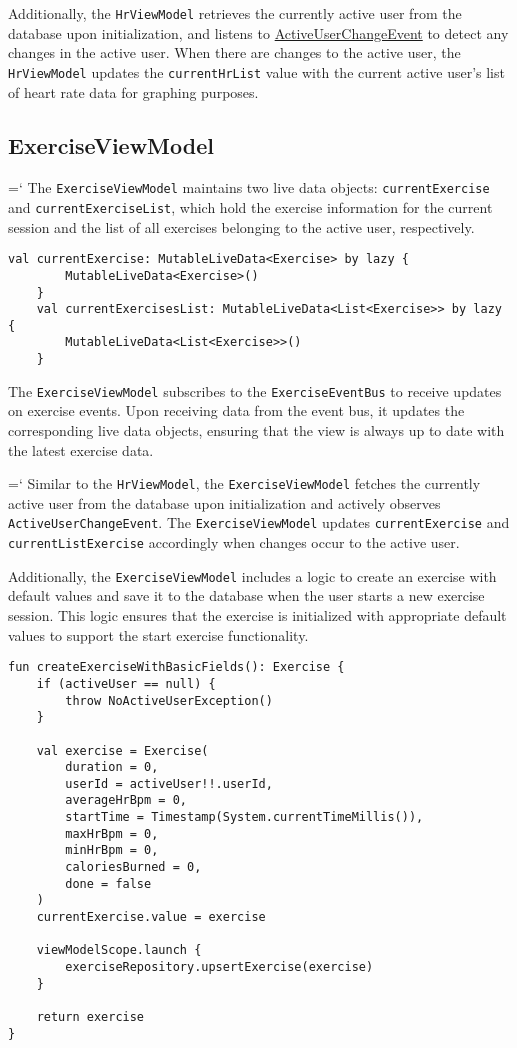 Additionally, the \verb;HrViewModel; retrieves the currently active user from the database upon initialization, and listens to \url{ActiveUserChangeEvent} to detect any changes in the active user.
When there are changes to the active user, the \verb;HrViewModel; updates the \verb;currentHrList; value with the current active user's list of heart rate data for graphing purposes.

\subsection{ExerciseViewModel}
\label{chap:exerciseviewmodel_impl}
{{\ttfamily \hyphenchar\the\font=`\-}
The \verb;ExerciseViewModel; maintains two live data objects: \texttt{currentExercise} and \texttt{currentExerciseList}, which hold the exercise information for the current session and the list of all exercises belonging to the active user, respectively. 
\par}

\begin{lstlisting}[caption={LiveData implementation (ExerciseViewModel)}]
    val currentExercise: MutableLiveData<Exercise> by lazy {
        MutableLiveData<Exercise>()
    }
    val currentExercisesList: MutableLiveData<List<Exercise>> by lazy {
        MutableLiveData<List<Exercise>>()
    }
\end{lstlisting}
The \verb;ExerciseViewModel; subscribes to the \verb;ExerciseEventBus; to receive updates on exercise events. Upon receiving data from the event bus, it updates the corresponding live data objects, ensuring that the view is always up to date with the latest exercise data.

{{\ttfamily \hyphenchar\the\font=`\-}
Similar to the \verb;HrViewModel;, the \verb;ExerciseViewModel; fetches the currently active user from the database upon initialization and actively observes \texttt{ActiveUserChangeEvent}.
The \verb;ExerciseViewModel; updates \verb;currentExercise; and \texttt{currentListExercise} accordingly when changes occur to the active user.
\par}

Additionally, the \verb;ExerciseViewModel; includes a logic to create an exercise with default values and save it to the database when the user starts a new exercise session. This logic ensures that the exercise is initialized with appropriate default values to support the start exercise functionality.
\begin{lstlisting}[caption={Create default exercise function (ExerciseViewModel)}]
fun createExerciseWithBasicFields(): Exercise {
    if (activeUser == null) {
        throw NoActiveUserException()
    }

    val exercise = Exercise(
        duration = 0,
        userId = activeUser!!.userId,
        averageHrBpm = 0,
        startTime = Timestamp(System.currentTimeMillis()),
        maxHrBpm = 0,
        minHrBpm = 0,
        caloriesBurned = 0,
        done = false
    )
    currentExercise.value = exercise

    viewModelScope.launch {
        exerciseRepository.upsertExercise(exercise)
    }

    return exercise
}
\end{lstlisting}

